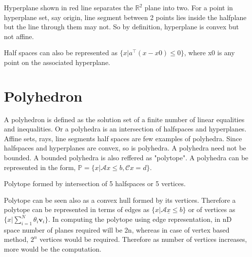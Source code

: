\documentclass{tufte-handout}
\theoremstyle{remark}
\renewcommand{\vec}[1]{\underline{#1}}
\begin{document}
\begin{marginfigure}
\caption{Hyperplane shown in red line separates the $\mathbb{R}^2$ plane into two. For a point in hyperplane set, say origin, line segment between 2 points lies inside the halfplane but the line through them may not. So by definition, hyperplane is convex but not affine.}

\end{marginfigure}
Half spaces can also be represented as $\{x|a^\top (x-x0) \le 0\}$, where x0 is any point on the associated hyperplane.
\section{Polyhedron}
A polyhedron is defined as the solution set of a finite number of linear equalities and inequalities. Or a polyhedra is an intersection of halfspaces and hyperplanes. Affine sets, rays, line segments half spaces are few examples of polyhedra. Since halfspaces and hyperplanes are convex, so is polyhedra. A polyhedra need not be bounded. A bounded polyhedra is also reffered as "polytope". A polyhedra can be represented in the form, $\mathbb{P}=\{x| \mathcal{A}x \le b, \mathcal{C}x=d\}$.
\begin{marginfigure}
\caption{Polytope formed by intersection of 5 halfspaces or 5 vertices.}
\end{marginfigure}
Polytope can be seen also as a convex hull formed by its vertices.
Therefore a polytope can be represented in terms of edges as $\{x|\mathcal{A}\vec{x}  \le b\}$ or of vertices as $\{x|\sum_{i=1}^N\theta_i\mathbf{v}_i\}$.
In computing the polytope using edge representation, in nD space number of planes required will be 2n, whereas in case of vertex based method, $2^n$ vertices would be required. Therefore as number of vertices increases, more would be the computation.
\end{document}
